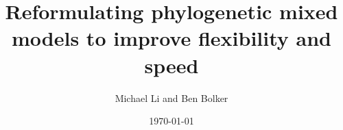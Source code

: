 \documentclass[12pt]{article}
\title{Reformulating phylogenetic mixed models to improve flexibility and speed}
\author{Michael Li and Ben Bolker}
\date{\today}
\date{}
\begin{document}
\newcommand{\dbic}{\ensuremath \Delta \textrm{BIC}}

\newcommand{\bmbhide}[1]{}
\newcommand{\bmb}[1]{{\color{blue} BB: #1}}


\renewcommand{\figurename}{Fig.}

\newcommand{\mli}[1]{{\color{red} ML: #1}}

\newcommand{\add}[1]{{\color{blue} ADD: #1}}


\newcommand{\pkg}[1]{{\tt #1}}
\newcommand{\code}[1]{{\tt #1}}






\end{document}

